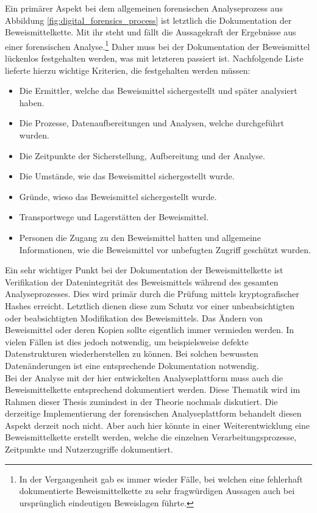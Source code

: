 \noindent
Ein primärer Aspekt bei dem allgemeinen forensischen Analyseprozess aus Abbildung \ref{fig:digital_forensics_process} ist letztlich die Dokumentation der Beweismittelkette. Mit ihr steht und fällt die Aussagekraft der Ergebnisse aus einer forensischen Analyse.\footnote{In der Vergangenheit gab es immer wieder Fälle, bei welchen eine fehlerhaft dokumentierte Beweismittelkette zu sehr fragwürdigen Aussagen auch bei ursprünglich eindeutigen Beweislagen führte.} Daher muss bei der Dokumentation der Beweismittel lückenlos festgehalten werden, was mit letzteren passiert ist. Nachfolgende Liste lieferte hierzu wichtige Kriterien, die festgehalten werden müssen:
\begin{itemize}
\item Die Ermittler, welche das Beweismittel sichergestellt und später analysiert haben.
\item Die Prozesse, Datenaufbereitungen und Analysen, welche durchgeführt wurden.
\item Die Zeitpunkte der Sicherstellung, Aufbereitung und der Analyse.
\item Die Umstände, wie das Beweismittel sichergestellt wurde.
\item Gründe, wieso das Beweismittel sichergestellt wurde.
\item Transportwege und Lagerstätten der Beweismittel.
\item Personen die Zugang zu den Beweismittel hatten und allgemeine Informationen, wie die Beweismittel vor unbefugten Zugriff geschützt wurden.
\end{itemize}

Ein sehr wichtiger Punkt bei der Dokumentation der Beweismittelkette ist Verifikation der Datenintegrität des Beweismittels während des gesamten Analyseprozesses. Dies wird primär durch die Prüfung mittels kryptografischer Hashes erreicht. Letztlich dienen diese zum Schutz vor einer unbeabsichtigten oder beabsichtigten Modifikation des Beweismittels. Das Ändern von Beweismittel oder deren Kopien sollte eigentlich immer vermieden werden. In vielen Fällen ist dies jedoch notwendig, um beispielsweise defekte Datenstrukturen wiederherstellen zu können. Bei solchen bewussten Datenänderungen ist eine entsprechende Dokumentation notwendig.\\ 
Bei der Analyse mit der hier entwickelten Analyseplattform muss auch die Beweismittelkette entsprechend dokumentiert werden. Diese Thematik wird im Rahmen dieser Thesis zumindest in der Theorie nochmals diskutiert. Die derzeitige Implementierung der forensischen Analyseplattform behandelt diesen Aspekt derzeit noch nicht. Aber auch hier könnte in einer Weiterentwicklung eine Beweismittelkette erstellt werden, welche die einzelnen Verarbeitungsprozesse, Zeitpunkte und Nutzerzugriffe dokumentiert.\\



